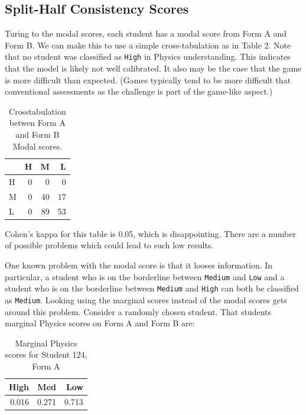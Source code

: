 \documentclass[]{article}
\begin{document}
\subsection{Split-Half Consistency
Scores}\label{split-half-consistency-scores}

Turing to the modal scores, each student has a modal score from Form A
and Form B. We can make this to use a simple cross-tabulation as in
Table 2. Note that no student was classified as \texttt{High} in Physics
understanding. This indicates that the model is likely not well
calibrated. It also may be the case that the game is more difficult than
expected. (Games typically tend to be more difficult that conventional
assessments as the challenge is part of the game-like aspect.)

\begin{table}

\caption{\label{tab:Crosstab}Crosstabulation betwen Form A and Form B Modal scores.}
\centering
\begin{tabular}[t]{lrrr}
\toprule
  & H & M & L\\
\midrule
H & 0 & 0 & 0\\
M & 0 & 40 & 17\\
L & 0 & 89 & 53\\
\bottomrule
\end{tabular}
\end{table}

Cohen's kappa for this table is 0.05, which is disappointing. There are
a number of possible problems which could lead to such low results.

One known problem with the modal score is that it looses information. In
particular, a student who is on the borderline between \texttt{Medium}
and \texttt{Low} and a student who is on the borderline between
\texttt{Medium} and \texttt{High} can both be classified as
\texttt{Medium}. Looking using the marginal scores instead of the modal
scores gets around this problem. Consider a randomly chosen student.
That students marginal Physics scores on Form A and Form B are:

\begin{table}

\caption{\label{tab:FormAB124}Marginal Physics scores for Student 124, Form A}
\centering
\begin{tabular}[t]{rrr}
\toprule
High & Med & Low\\
\midrule
0.016 & 0.271 & 0.713\\
\bottomrule
\end{tabular}
\end{table}
\end{document}
